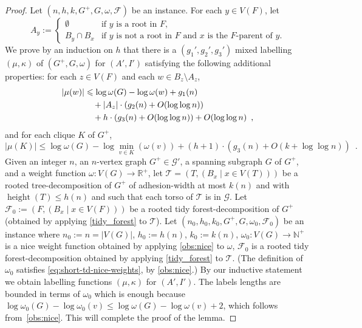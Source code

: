 \documentclass[twoside,leqno]{article}
\newcommand{\R}{\mathbb{R}}
\newcommand{\N}{\mathbb{N}}
\let\eqref\cref
\renewcommand{\le}{\leqslant}
\renewcommand{\leq}{\leqslant}
\DeclareMathOperator{\height}{height}
\newcommand{\Oh}{O}
\begin{document}
\begin{proof}
  Let $(n,h,k,G^+,G,\omega,\mathcal{F})$ be an instance.
  For each $y\in V(F)$, let
  \[
    A_y:=\begin{cases}
      \emptyset   & \textrm{if $y$ is a root in $F$,}                                      \\
      B_y\cap B_x & \textrm{if $y$ is not a root in $F$ and $x$ is the $F$-parent of $y$.}
    \end{cases}
  \]
  We prove by an induction on $h$ that there is a $(g_1',g_2',g_3')$ mixed labelling $(\mu,\kappa)$ of $(G^+,G,\omega)$ for $(A',I')$ satisfying the following additional properties: for each $z\in V(F)$ and each $w\in B_z\setminus A_z$,
  \begin{align}
    |\mu(w)|
     & \le \log \omega(G) - \log \omega(w) + g_1(n)\notag                           \\
     & \quad {} + |A_z|\cdot (g_2(n) + \Oh(\log\log n))\label{strong_strong}        \\
     & \quad {} + h\cdot(g_3(n) + \Oh(\log\log n)) + \Oh(\log\log n)\enspace,\notag
  \end{align}
  and for each clique $K$ of $G^+$,
  \begin{equation}
    |\mu(K)| \le \log\omega(G) - \log\min_{v\in K}(\omega(v)) + (h+1)\cdot(g_3(n) + \Oh(k+\log\log n))\enspace.\label{strong_clique}
  \end{equation}
  Given an integer $n$, an $n$-vertex graph $G^+\in\mathcal{G}'$, a spanning subgraph $G$ of $G^+$, and a weight function $\omega:V(G)\to\R^+$, let $\mathcal{T}=(T,(B_x \mid x\in V(T)))$ be a rooted tree-decomposition of $G^+$ of adhesion-width at most $k(n)$ and with $\height(T)\leq h(n)$ and such that each torso of $\mathcal{T}$ is in $\mathcal{G}$. Let $\mathcal{F}_0:=(F,(B_x \mid x\in V(F)))$ be a rooted tidy forest-decomposition of $G^+$ (obtained by applying \cref{tidy_forest} to $\mathcal{T}$).  Let $(n_0,h_0,k_0,G^+,G,\omega_0,\mathcal{F}_0)$ be an instance where $n_0:=n=|V(G)|$, $h_0:=h(n)$, $k_0:=k(n)$, $\omega_0:V(G)\to\N^+$ is a nice weight function obtained by applying \cref{obs:nice} to $\omega$, $\mathcal{F}_0$ is a rooted tidy forest-decomposition obtained by applying \cref{tidy_forest} to $\mathcal{T}$.  (The definition of $\omega_0$ satisfies \eqref{eq:short-td-nice-weights}, by \cref{obs:nice}.)
  By our inductive statement we obtain labelling functions $(\mu,\kappa)$ for $(A',I')$.
  The labels lengths are bounded in terms of $\omega_0$ which is enough because $\log\omega_0(G) - \log\omega_0(v) \leq \log\omega(G)-\log\omega(v)+2$, which follows from~\cref{obs:nice}.
  This will complete the proof of the lemma.


\end{proof}
\end{document}
